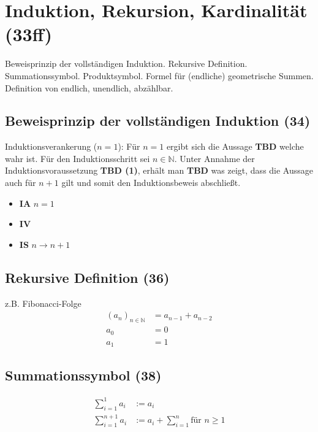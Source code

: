 \section{Induktion, Rekursion, Kardinalität (33ff)}
Beweisprinzip der vollständigen Induktion. Rekursive Definition. Summationssymbol. Produktsymbol. Formel für (endliche) geometrische Summen. Definition von endlich, unendlich, abzählbar. 

\subsection{Beweisprinzip der vollständigen Induktion (34)}
Induktionsverankerung ($n=1$): Für $n=1$ ergibt sich die Aussage \textbf{TBD} welche wahr ist. Für den
Induktionsschritt sei $n\in\mathbb{N}$. Unter Annahme der Induktionsvoraussetzung \textbf{TBD (1)}, erhält man
\textbf{TBD} was zeigt, dass die Aussage auch für $n+1$ gilt und somit den Induktionsbeweis abschließt.

\begin{itemize}
\item \textbf{IA} $n=1$
\item \textbf{IV} 
\item \textbf{IS} $n \rightarrow n+1$
\end{itemize}

\subsection{Rekursive Definition (36)}
z.B. Fibonacci-Folge
\begin{equation}
\begin{split}
(a_n)_{n \in \mathbb{N}} &= a_{n-1} + a_{n-2} \\ 
a_0 &= 0 \\
a_1 &= 1
\end{split}
\end{equation}

\subsection{Summationssymbol (38)}
\begin{equation}
\begin{split}
\sum\nolimits_{i=1}^1 a_i &:= a_i \\
\sum\nolimits_{i=1}^{n+1} a_i &:=  a_i + \sum\nolimits_{i=1}^{n} \text{für } n \geq 1
\end{split}
\end{equation}

